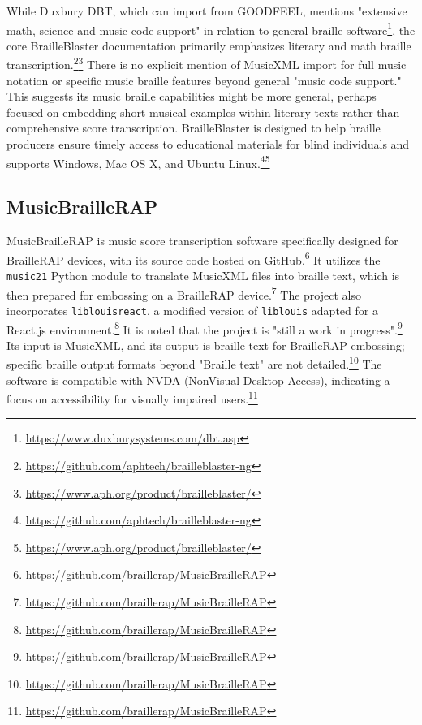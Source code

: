 While Duxbury DBT, which can import from GOODFEEL, mentions "extensive math, science and music code support" in relation to general braille software\footnote{\url{https://www.duxburysystems.com/dbt.asp}}, the core BrailleBlaster documentation primarily emphasizes literary and math braille transcription.\footnote{\url{https://github.com/aphtech/brailleblaster-ng}}\footnote{\url{https://www.aph.org/product/brailleblaster/}} There is no explicit mention of MusicXML import for full music notation or specific music braille features beyond general "music code support." This suggests its music braille capabilities might be more general, perhaps focused on embedding short musical examples within literary texts rather than comprehensive score transcription. BrailleBlaster is designed to help braille producers ensure timely access to educational materials for blind individuals and supports Windows, Mac OS X, and Ubuntu Linux.\footnote{\url{https://github.com/aphtech/brailleblaster-ng}}\footnote{\url{https://www.aph.org/product/brailleblaster/}}

\subsection{MusicBrailleRAP}
MusicBrailleRAP is music score transcription software specifically designed for BrailleRAP devices, with its source code hosted on GitHub.\footnote{\url{https://github.com/braillerap/MusicBrailleRAP}} It utilizes the \texttt{music21} Python module to translate MusicXML files into braille text, which is then prepared for embossing on a BrailleRAP device.\footnote{\url{https://github.com/braillerap/MusicBrailleRAP}} The project also incorporates \texttt{liblouisreact}, a modified version of \texttt{liblouis} adapted for a React.js environment.\footnote{\url{https://github.com/braillerap/MusicBrailleRAP}} It is noted that the project is "still a work in progress".\footnote{\url{https://github.com/braillerap/MusicBrailleRAP}} Its input is MusicXML, and its output is braille text for BrailleRAP embossing; specific braille output formats beyond "Braille text" are not detailed.\footnote{\url{https://github.com/braillerap/MusicBrailleRAP}} The software is compatible with NVDA (NonVisual Desktop Access), indicating a focus on accessibility for visually impaired users.\footnote{\url{https://github.com/braillerap/MusicBrailleRAP}}

